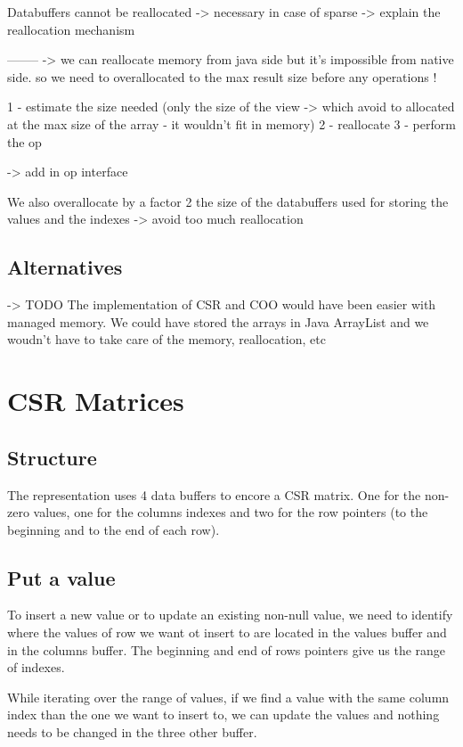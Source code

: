 Databuffers cannot be reallocated -> necessary in case of sparse
-> explain the reallocation mechanism

--------
-> we can reallocate memory from java side but it's impossible from native side. so we need to overallocated to the max result size before any operations !

1 - estimate the size needed (only the size of the view -> which avoid to allocated at the max size of the array - it wouldn't fit in memory)
2 - reallocate
3 - perform the op

-> add in op interface

We also overallocate by a factor 2 the size of the databuffers used for storing the values and the indexes -> avoid too much reallocation

\subsection{Alternatives}
-> TODO %
The implementation of CSR and COO would have been easier with managed memory. We could have stored the arrays in Java ArrayList and we woudn't have to take care of the memory, reallocation, etc 


\section{CSR Matrices}
\subsection{Structure}

The representation uses 4 data buffers to encore a CSR matrix. One for the non-zero values, one for the columns indexes and two for the row pointers (to the beginning and to the end of each row).

\subsection{Put a value}

To insert a new value or to update an existing non-null value, we need to identify where the values of row we want ot insert to are located in the values buffer and in the columns buffer. The beginning and end of rows pointers give us the range of indexes.

While iterating over the range of values, if we find a value with the same column index than the one we want to insert to, we can update the values and nothing needs to be changed in the three other buffer. 

